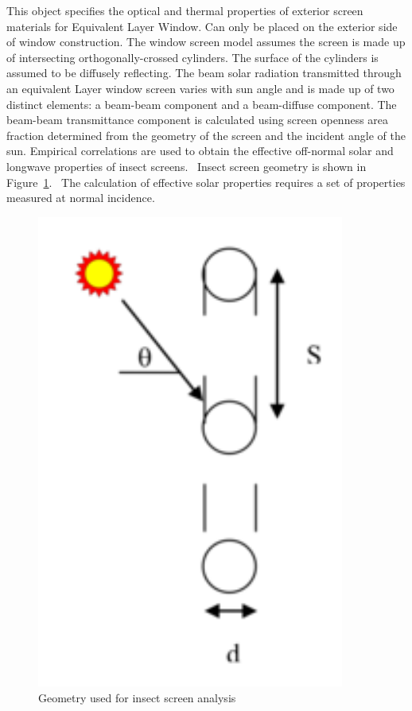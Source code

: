 This object specifies the optical and thermal properties of exterior screen materials for Equivalent Layer Window. Can only be placed on the exterior side of window construction. The window screen model assumes the screen is made up of intersecting orthogonally-crossed cylinders. The surface of the cylinders is assumed to be diffusely reflecting. The beam solar radiation transmitted through an equivalent Layer window screen varies with sun angle and is made up of two distinct elements: a beam-beam component and a beam-diffuse component. The beam-beam transmittance component is calculated using screen openness area fraction determined from the geometry of the screen and the incident angle of the sun. Empirical correlations are used to obtain the effective off-normal solar and longwave properties of insect screens.~ Insect screen geometry is shown in Figure~\ref{fig:geometry-used-for-insect-screen-analysis}.~ The calculation of effective solar properties requires a set of properties measured at normal incidence.

\begin{figure}[hbtp] %
\centering
\includegraphics[width=0.9\textwidth, height=0.9\textheight, keepaspectratio=true]{media/image048.png}
\caption{Geometry used for insect screen analysis \protect \label{fig:geometry-used-for-insect-screen-analysis}}
\end{figure}

